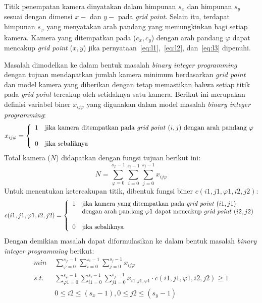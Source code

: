 Titik penempatan kamera dinyatakan dalam himpunan \(s_x\) dan himpunan \(s_y\) sesuai dengan dimensi \(x-\) dan \(y-\) pada \textit{grid point}. Selain itu, terdapat himpunan \(s_\varphi\) yang menyatakan arah pandang yang memungkinkan bagi setiap kamera. Kamera yang ditempatkan pada (\(c_x,c_y\)) dengan arah pandang \(\varphi\) dapat mencakup \textit{grid point} (\(x,y\)) jika pernyataan~\ref{eq:l1},~\ref{eq:l2}, dan~\ref{eq:l3} dipenuhi.

Masalah dimodelkan ke dalam bentuk masalah \textit{binary integer programming} dengan tujuan mendapatkan jumlah kamera minimum berdasarkan \textit{grid point} dan model kamera yang diberikan dengan tetap memastikan bahwa setiap titik pada \textit{grid point} tercakup oleh setidaknya satu kamera. Berikut ini merupakan definisi variabel biner \(x_{ij\varphi}\) yang digunakan dalam model masalah \textit{binary integer programming}:
\begin{equation}
	x_{ij\varphi}=\left\{
		\begin{array}{cl}
			1 & \text{jika kamera ditempatkan pada \textit{grid point} }(i,j) \text{ dengan arah pandang } \varphi\\\\
			0 & \text{jika sebaliknya}
		\end{array}
	\right.
\end{equation}
Total kamera (\(N\)) didapatkan dengan fungsi tujuan berikut ini:
\begin{equation}
	N=\sum_{\varphi=0}^{s_\varphi-1}\sum_{i=0}^{s_i-1}\sum_{j=0}^{s_j-1}x_{ij\varphi}
\end{equation}
Untuk menentukan ketercakupan titik, dibentuk fungsi biner \(c(i1,j1,\varphi1,i2,j2)\):
\begin{equation}
	c(i1,j1,\varphi1,i2,j2)=\left \{
		\begin{array}{cl}
			1 & \text{jika kamera yang ditempatkan pada \textit{grid point} }(i1,j1)\\
			 & \text{dengan arah pandang }\varphi{1}\text{ dapat mencakup \textit{grid point} }(i2,j2)\\\\
			 0 & \text{jika sebaliknya}
		\end{array}
	\right.
\end{equation}
Dengan demikian masalah dapat diformulasikan ke dalam bentuk masalah \textit{binary integer programming} berikut:
\begin{equation}
	\begin{split}
		\textit{min } & \sum_{\varphi=0}^{s_\varphi-1}\sum_{i=0}^{s_i-1}\sum_{j=0}^{s_j-1}x_{ij\varphi}\\
		\textit{s.t. } & \sum_{\varphi{1}=0}^{s_\varphi-1}\sum_{i1=0}^{s_i-1}\sum_{j1=0}^{s_j-1}x_{i1,j1,\varphi{1}}\cdot c(i1,j1,\varphi1,i2,j2)\geq 1\\
		&0\leq i2\leq(s_x-1), 0\leq j2\leq(s_y-1)
	\end{split}
	\label{eq:lpformhorster}
\end{equation}
